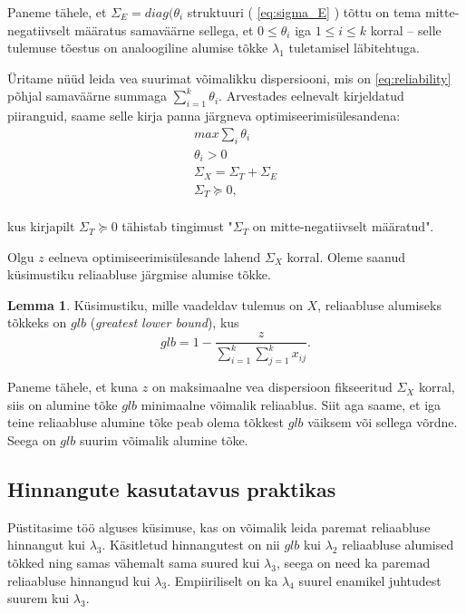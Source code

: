 \documentclass[a4paper,12pt,oneside]{article}
\newcounter{lemma}[section]
\numberwithin{equation}{section}
\theoremstyle{definition}
\newtheorem{glb}[lemma]{Lemma}
\begin{document}
Paneme tähele, et $\Sigma_E=diag(\theta_i$ struktuuri  ( \ref{eq:sigma_E} ) tõttu on tema mitte-negatiivselt määratus samaväärne sellega, et $0 \leq \theta_i$ iga $1 \leq i \leq k$ korral -- selle tulemuse tõestus on analoogiline alumise tõkke $\lambda_1$ tuletamisel läbitehtuga.

 
\"Uritame n\"u\"ud  leida vea suurimat võimalikku dispersiooni, mis on \eqref{eq:reliability} põhjal samaväärne summaga $\sum \limits_{i=1}^k \theta_i$. Arvestades eelnevalt kirjeldatud piiranguid, saame selle  kirja panna järgneva optimiseerimis\"ulesandena:
\begin{equation}
\begin{gathered}
max \sum_i \theta_i \\
\theta_i > 0 \\
\Sigma_X = \Sigma_T + \Sigma_E \\
\Sigma_T \succeq 0, \\
\end{gathered} 
\end{equation} 

kus kirjapilt $\Sigma_T \succeq 0$ tähistab tingimust "$\Sigma_T$ on mitte-negatiivselt määratud". 

Olgu $z$ eelneva optimiseerimis\"ulesande lahend $\Sigma_X$ korral. Oleme saanud küsimustiku reliaabluse järgmise alumise tõkke.
\vspace{10pt}
\begin{glb}
Küsimustiku, mille vaadeldav tulemus on $X$, reliaabluse alumiseks tõkkeks on $glb$ (\textit{greatest lower bound}), kus 
\begin{equation*}
glb = 1 - \frac{z}{\sum \limits_{i=1}^k \sum \limits_{j=1}^k x_{ij}} \text{.}
\end{equation*}  
\end{glb}

Paneme tähele, et kuna $z$ on maksimaalne vea dispersioon fikseeritud $\Sigma_X$ korral, siis on alumine tõke $glb$ minimaalne võimalik reliaablus. Siit aga saame, et iga teine reliaabluse alumine tõke peab olema tõkkest $glb$ väiksem või sellega võrdne. Seega on $glb$ suurim võimalik alumine tõke. 

\subsection{Hinnangute kasutatavus praktikas}

Püstitasime töö alguses küsimuse, kas on võimalik leida paremat reliaabluse hinnangut kui $\lambda_3$. Käsitletud hinnangutest on nii $glb$ kui $\lambda_2$ reliaabluse alumised tõkked ning samas vähemalt sama suured kui $\lambda_3$, seega on need ka paremad reliaabluse hinnangud kui $\lambda_3$. Empiiriliselt on ka $\lambda_4$ suurel enamikel juhtudest suurem kui $\lambda_3$.
\end{document}
